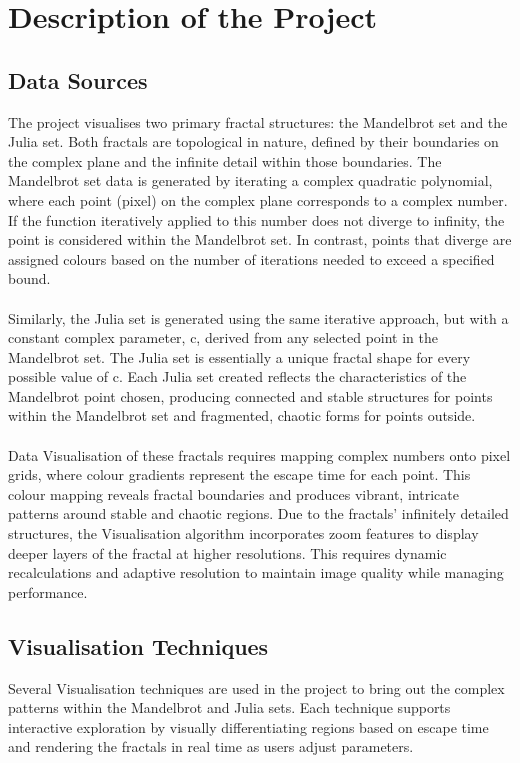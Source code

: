 \documentclass[12pt,a4paper]{report}
\begin{document}
\section{Description of the Project}
\subsection{Data Sources}
The project visualises two primary fractal structures: the Mandelbrot set and the Julia set. Both fractals are topological in nature, defined by their boundaries on the complex plane and the infinite detail within those boundaries. The Mandelbrot set data is generated by iterating a complex quadratic polynomial, where each point (pixel) on the complex plane corresponds to a complex number. If the function iteratively applied to this number does not diverge to infinity, the point is considered within the Mandelbrot set. In contrast, points that diverge are assigned colours based on the number of iterations needed to exceed a specified bound. 
\\\\
Similarly, the Julia set is generated using the same iterative approach, but with a constant complex parameter, c, derived from any selected point in the Mandelbrot set. The Julia set is essentially a unique fractal shape for every possible value of c. Each Julia set created reflects the characteristics of the Mandelbrot point chosen, producing connected and stable structures for points within the Mandelbrot set and fragmented, chaotic forms for points outside. 
\\\\
Data Visualisation of these fractals requires mapping complex numbers onto pixel grids, where colour gradients represent the escape time for each point. This colour mapping reveals fractal boundaries and produces vibrant, intricate patterns around stable and chaotic regions. Due to the fractals’ infinitely detailed structures, the Visualisation algorithm incorporates zoom features to display deeper layers of the fractal at higher resolutions. This requires dynamic recalculations and adaptive resolution to maintain image quality while managing performance. 

\subsection{Visualisation Techniques}
Several Visualisation techniques are used in the project to bring out the complex patterns within the Mandelbrot and Julia sets. Each technique supports interactive exploration by visually differentiating regions based on escape time and rendering the fractals in real time as users adjust parameters.
\end{document}

